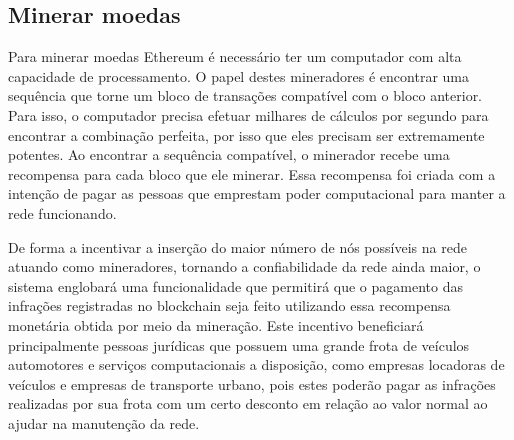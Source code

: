         
\subsection{Minerar moedas}

Para minerar moedas Ethereum é necessário ter um computador com alta capacidade de processamento. O papel destes mineradores é encontrar uma sequência que torne um bloco de transações compatível com o bloco anterior. Para isso, o computador precisa efetuar milhares de cálculos por segundo para encontrar a combinação perfeita, por isso que eles precisam ser extremamente potentes. Ao encontrar a sequência compatível, o minerador recebe uma recompensa para cada bloco que ele minerar. Essa recompensa foi criada com a intenção de pagar as pessoas que emprestam poder computacional para manter a rede funcionando.

De forma a incentivar a inserção do maior número de nós possíveis na rede atuando como mineradores, tornando a confiabilidade da rede ainda maior, o sistema englobará uma funcionalidade que permitirá que o pagamento das infrações registradas no blockchain seja feito utilizando essa recompensa monetária obtida por meio da mineração. Este incentivo beneficiará principalmente pessoas jurídicas que possuem uma grande frota de veículos automotores e serviços computacionais a disposição, como empresas locadoras de veículos e empresas de transporte urbano, pois estes poderão pagar as infrações realizadas por sua frota com um certo desconto em relação ao valor normal ao ajudar na manutenção da rede.
